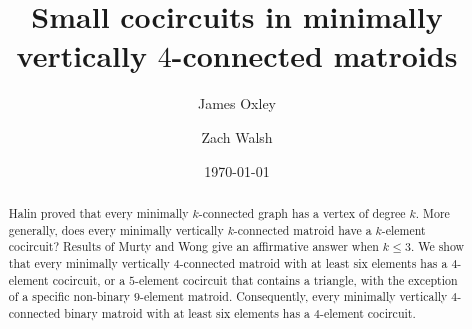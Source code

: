 \documentclass[12pt]{amsart}
\title[Minimally vertically $4$-connected matroids]{Small cocircuits in minimally vertically $4$-connected matroids}
\author{James Oxley}
\author{Zach Walsh}
\date{\today}
\begin{document}
\maketitle





\begin{abstract} 
Halin proved that every minimally $k$-connected graph has a vertex of degree $k$.
More generally, does every minimally vertically $k$-connected matroid have a $k$-element cocircuit? 
Results of Murty and Wong give an affirmative answer when $k \le 3$.
We show that every minimally vertically $4$-connected matroid with at least six elements has a $4$-element cocircuit, or a $5$-element cocircuit that contains a triangle, with the exception of a specific non-binary $9$-element matroid.
Consequently, every minimally vertically $4$-connected binary matroid with at least six elements has a $4$-element cocircuit.
\end{abstract}









\end{document}
